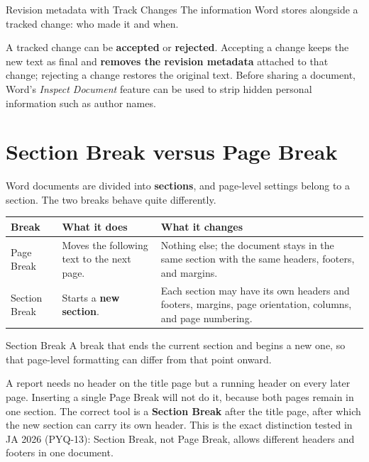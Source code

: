 \begin{definitionbox}{Revision metadata with Track Changes}
The information Word stores alongside a tracked change: who made it and when.
\end{definitionbox}

A tracked change can be \textbf{accepted} or \textbf{rejected}. Accepting a
change keeps the new text as final and \textbf{removes the revision metadata}
attached to that change; rejecting a change restores the original text. Before
sharing a document, Word's \emph{Inspect Document} feature can be used to
strip hidden personal information such as author names.

\section{Section Break versus Page Break}
Word documents are divided into \textbf{sections}, and page-level settings
belong to a section. The two breaks behave quite differently.

\begin{center}
\begin{tabular}{p{}p{}p{}}
\toprule
\textbf{Break} & \textbf{What it does} & \textbf{What it changes} \\
\midrule
Page Break & Moves the following text to the next page. & Nothing else; the
document stays in the same section with the same headers, footers, and
margins. \\
Section Break & Starts a \textbf{new section}. & Each section may have its own
headers and footers, margins, page orientation, columns, and page numbering. \\
\bottomrule
\end{tabular}
\end{center}

\begin{definitionbox}{Section Break}
A break that ends the current section and begins a new one, so that
page-level formatting can differ from that point onward.
\end{definitionbox}

\begin{example}
A report needs no header on the title page but a running header on every later
page. Inserting a single Page Break will not do it, because both pages remain
in one section. The correct tool is a \textbf{Section Break} after the title
page, after which the new section can carry its own header. This is the exact
distinction tested in JA 2026 (PYQ-13): Section Break, not Page Break, allows
different headers and footers in one document.
\end{example}

